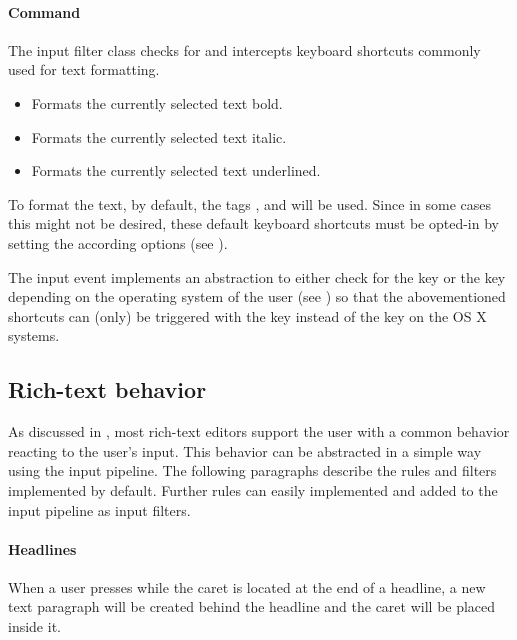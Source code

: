 \paragraph{Command} The  input filter class checks for and intercepts keyboard shortcuts commonly used for text formatting. 

\begin{itemize}
\item {} Formats the currently selected text bold.
\item {} Formats the currently selected text italic. 
\item {} Formats the currently selected text underlined.
\end{itemize}

To format the text, by default, the tags ,  and  will be used. Since in some cases this might not be desired, these default keyboard shortcuts must be opted-in by setting the according options (see ).

The input event implements an abstraction to either check for the  key or the  key depending on the operating system of the user (see ) so that the abovementioned shortcuts can (only) be triggered with the  key instead of the  key on the OS X systems.


\subsection{Rich-text behavior}

As discussed in , most rich-text editors support the user with a common behavior reacting to the user's input. This behavior can be abstracted in a simple way using the input pipeline. The following paragraphs describe the rules and filters implemented by default. Further rules can easily implemented and added to the input pipeline as input filters.

\paragraph{Headlines} When a user presses  while the caret is located at the end of a headline, a new text paragraph will be created behind the headline and the caret will be placed inside it.

